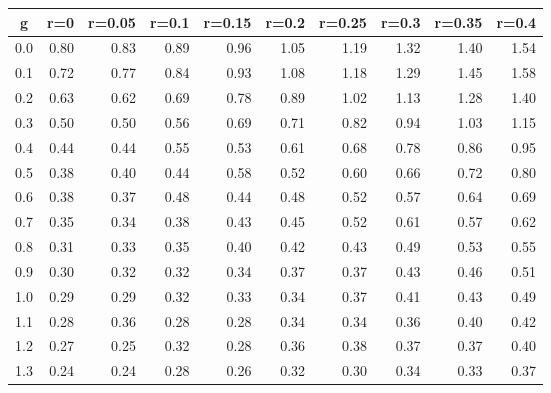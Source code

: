 %
\begin{table}[!tbp]
 \begin{center}
 \begin{tabular}{rrrrrrrrrr}\hline\hline
\multicolumn{1}{c}{g}&\multicolumn{1}{c}{r=0}&\multicolumn{1}{c}{r=0.05}&\multicolumn{1}{c}{r=0.1}&\multicolumn{1}{c}{r=0.15}&\multicolumn{1}{c}{r=0.2}&\multicolumn{1}{c}{r=0.25}&\multicolumn{1}{c}{r=0.3}&\multicolumn{1}{c}{r=0.35}&\multicolumn{1}{c}{r=0.4}\tabularnewline
\hline
0.0&0.80&0.83&0.89&0.96&1.05&1.19&1.32&1.40&1.54\tabularnewline
0.1&0.72&0.77&0.84&0.93&1.08&1.18&1.29&1.45&1.58\tabularnewline
0.2&0.63&0.62&0.69&0.78&0.89&1.02&1.13&1.28&1.40\tabularnewline
0.3&0.50&0.50&0.56&0.69&0.71&0.82&0.94&1.03&1.15\tabularnewline
0.4&0.44&0.44&0.55&0.53&0.61&0.68&0.78&0.86&0.95\tabularnewline
0.5&0.38&0.40&0.44&0.58&0.52&0.60&0.66&0.72&0.80\tabularnewline
0.6&0.38&0.37&0.48&0.44&0.48&0.52&0.57&0.64&0.69\tabularnewline
0.7&0.35&0.34&0.38&0.43&0.45&0.52&0.61&0.57&0.62\tabularnewline
0.8&0.31&0.33&0.35&0.40&0.42&0.43&0.49&0.53&0.55\tabularnewline
0.9&0.30&0.32&0.32&0.34&0.37&0.37&0.43&0.46&0.51\tabularnewline
1.0&0.29&0.29&0.32&0.33&0.34&0.37&0.41&0.43&0.49\tabularnewline
1.1&0.28&0.36&0.28&0.28&0.34&0.34&0.36&0.40&0.42\tabularnewline
1.2&0.27&0.25&0.32&0.28&0.36&0.38&0.37&0.37&0.40\tabularnewline
1.3&0.24&0.24&0.28&0.26&0.32&0.30&0.34&0.33&0.37\tabularnewline
\hline
\end{tabular}

\end{center}

\end{table}

